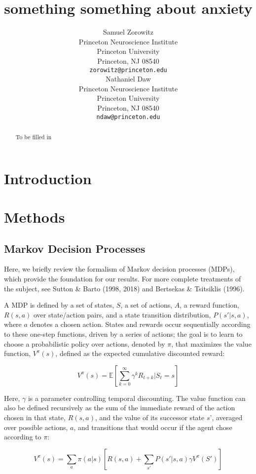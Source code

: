 \documentclass[11pt]{article} %
\title{something something about anxiety}
\author{
Samuel Zorowitz \\
Princeton Neuroscience Institute\\
Princeton University\\
Princeton, NJ 08540 \\
\texttt{zorowitz@princeton.edu} \\
\And
Nathaniel Daw \\
Princeton Neuroscience Institute\\
Princeton University\\
Princeton, NJ 08540 \\
\texttt{ndaw@princeton.edu} \\
}
\begin{document}
\maketitle

\begin{abstract}
To be filled in
\end{abstract}


\startmain %

\section{Introduction}


\section{Methods}

\subsection{Markov Decision Processes}

Here, we briefly review the formalism of Markov decision processes (MDPs), which
provide the foundation for our results. For more complete treatments of the
subject, see Sutton \& Barto (1998, 2018) and Bertsekas \& Tsitsiklis (1996).

A MDP is defined by a set of states, $S$, a set of actions, $A$, a reward
function, $R(s,a)$ over state/action pairs, and a state transition distribution,
$P(s'|s,a)$, where $a$ denotes a chosen action. States and rewards occur
sequentially according to these one-step functions, driven by a series of
actions; the goal is to learn to choose a probabilistic policy over actions,
denoted by $\pi$, that maximizes the value function, $V^\pi(s)$, defined as the
expected cumulative discounted reward:

$$ V^\pi(s) = \mathbb{E} \left[ \sum^{\infty}_{k=0} \gamma^k R_{t+k} | S_t = s \right] $$

Here, $\gamma$ is a parameter controlling temporal discounting. The value function
can also be defined recursively as the sum of the immediate reward of the action
chosen in that state, $R(s, a)$, and the value of its successor state $s’$,
averaged over possible actions, $a$, and transitions that would occur if the agent
chose according to $\pi$:

$$ V^\pi(s) = \sum_a \pi(a|s) \left[ R(s,a) + \sum_{s'} P(s'|s,a) \gamma V^\pi (S') \right] $$
\end{document}
